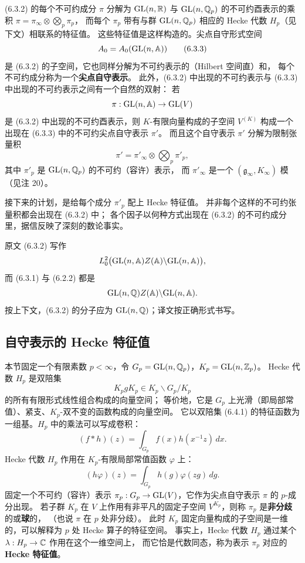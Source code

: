 (6.3.2) 的每个不可约成分 $\pi$ 分解为 $\mathrm{GL}(n,\mathbb{R})$ 与 $\mathrm{GL}(n,\mathbb{Q}_p)$ 的不可约酉表示的乘积
$\pi=\pi_{\infty}\otimes\bigotimes_p\pi_p$，
而每个 $\pi_p$ 带有与群 $\mathrm{GL}(n,\mathbb{Q}_p)$ 相应的 Hecke 代数 $H_p$（见下文）相联系的特征值。
这些特征值是这样构造的。尖点自守形式空间
\begin{equation*}
A_0=A_0(\mathrm{GL}(n,\mathbb{A}))
\tag{6.3.3}
\end{equation*}
是 (6.3.2) 的子空间，它也同样分解为不可约表示的（Hilbert 空间直）和，
每个不可约成分称为一个\textbf{尖点自守表示}。
此外，(6.3.2) 中出现的不可约表示与 (6.3.3) 中出现的不可约表示之间有一个自然的双射：
若
\[
\pi:\mathrm{GL}(n,\mathbb{A})\to\mathrm{GL}(V)
\]
是 (6.3.2) 中出现的不可约酉表示，则 $K$-有限向量构成的子空间 $V^{(K)}$
构成一个出现在 (6.3.3) 中的不可约尖点自守表示 $\pi'$。
而且这个自守表示 $\pi'$ 分解为限制张量积
\[
\pi'=\pi'_{\infty}\otimes\bigotimes_p\pi'_p,
\]
其中 $\pi'_p$ 是 $\mathrm{GL}(n,\mathbb{Q}_p)$ 的不可约（容许）表示，
而 $\pi'_{\infty}$ 是一个 $(\mathfrak g_{\infty},K_{\infty})$ 模（见注 20）。

接下来的计划，是给每个成分 $\pi'_p$ 配上 Hecke 特征值。
并非每个这样的不可约张量积都会出现在 (6.3.2) 中；
各个因子以何种方式出现在 (6.3.2) 的不可约成分里，据信反映了深刻的数论事实。

\begin{yizhu}
原文 (6.3.2) 写作
\[
L^2_0\bigl(\mathrm{GL}(n,\mathbb{A})Z(\mathbb{A})\backslash\mathrm{GL}(n,\mathbb{A})\bigr),
\]
而 (6.3.1) 与 (6.2.2) 都是
\[
\mathrm{GL}(n,\mathbb{Q})Z(\mathbb{A})\backslash\mathrm{GL}(n,\mathbb{A}).
\]
按上下文，(6.3.2) 的分子应为 $\mathrm{GL}(n,\mathbb{Q})$；译文按正确形式书写。
\end{yizhu}

\subsection{自守表示的 Hecke 特征值}

本节固定一个有限素数 $p<\infty$，令 $G_p=\mathrm{GL}(n,\mathbb{Q}_p)$，$K_p=\mathrm{GL}(n,\mathbb{Z}_p)$。
Hecke 代数 $H_p$ 是双陪集
\begin{equation*}
K_pgK_p\in K_p\backslash G_p/K_p
\tag{6.4.1}
\end{equation*}
的所有有限形式线性组合构成的向量空间；
等价地，它是 $G_p$ 上光滑（即局部常值）、紧支、$K_p$-双不变的函数构成的向量空间。
它以双陪集 (6.4.1) 的特征函数为一组基。$H_p$ 中的乘法可以写成卷积：
\[
(f*h)(z)=\int_{G_p}f(x)h(x^{-1}z)\,dx .
\]
Hecke 代数 $H_p$ 作用在 $K_p$-有限局部常值函数 $\varphi$ 上：
\[
(h\varphi)(z)=\int_{G_p}h(g)\varphi(zg)\,dg .
\]
固定一个不可约（容许）表示 $\pi_p:G_p\to\mathrm{GL}(V)$，它作为尖点自守表示 $\pi$ 的 $p$-成分出现。
若子群 $K_p$ 在 $V$ 上作用有非平凡的固定子空间 $V^{K_p}$，则称 $\pi_p$ 是\textbf{非分歧}的或\textbf{球}的，
（也说 $\pi$ 在 $p$ 处非分歧）。
此时 $K_p$ 固定向量构成的子空间是一维的，可以解释为 $p$ 处 Hecke 算子的特征空间。
事实上，Hecke 代数 $H_p$ 通过某个 $\lambda:H_p\to\mathbb{C}$ 作用在这个一维空间上，
而它恰是代数同态，称为表示 $\pi_p$ 对应的 \textbf{Hecke 特征值}。

